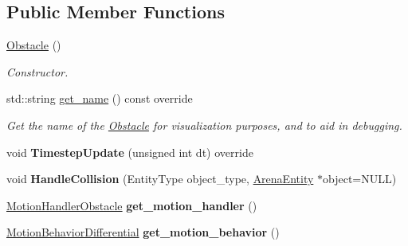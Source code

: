 \subsection*{Public Member Functions}
\begin{DoxyCompactItemize}
\item 
\hyperlink{classObstacle_a8f734072321fa06a7b7dae2d5f50f352}{Obstacle} ()\hypertarget{classObstacle_a8f734072321fa06a7b7dae2d5f50f352}{}\label{classObstacle_a8f734072321fa06a7b7dae2d5f50f352}

\begin{DoxyCompactList}\small\item\em Constructor. \end{DoxyCompactList}\item 
std\+::string \hyperlink{classObstacle_a4642d3f61b6e74fd5a9c91bb263dfe18}{get\+\_\+name} () const override\hypertarget{classObstacle_a4642d3f61b6e74fd5a9c91bb263dfe18}{}\label{classObstacle_a4642d3f61b6e74fd5a9c91bb263dfe18}

\begin{DoxyCompactList}\small\item\em Get the name of the \hyperlink{classObstacle}{Obstacle} for visualization purposes, and to aid in debugging. \end{DoxyCompactList}\item 
void {\bfseries Timestep\+Update} (unsigned int dt) override\hypertarget{classObstacle_adda549c77a5a67aa5423cb0f84b986df}{}\label{classObstacle_adda549c77a5a67aa5423cb0f84b986df}

\item 
void {\bfseries Handle\+Collision} (Entity\+Type object\+\_\+type, \hyperlink{classArenaEntity}{Arena\+Entity} $\ast$object=N\+U\+LL)\hypertarget{classObstacle_aa4e6d051a5fe8024d59425737baa381f}{}\label{classObstacle_aa4e6d051a5fe8024d59425737baa381f}

\item 
\hyperlink{classMotionHandlerObstacle}{Motion\+Handler\+Obstacle} {\bfseries get\+\_\+motion\+\_\+handler} ()\hypertarget{classObstacle_a3733568b7023389407d9d8cea358b329}{}\label{classObstacle_a3733568b7023389407d9d8cea358b329}

\item 
\hyperlink{classMotionBehaviorDifferential}{Motion\+Behavior\+Differential} {\bfseries get\+\_\+motion\+\_\+behavior} ()\hypertarget{classObstacle_aab71c0b9c09fa1c1429b3896a7adfb7c}{}\label{classObstacle_aab71c0b9c09fa1c1429b3896a7adfb7c}

\end{DoxyCompactItemize}
